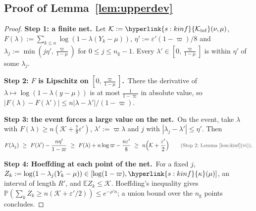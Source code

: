 \documentclass[10pt]{article}
\newcommand{\sy}[2]{{\hyperlink{#1}{#2}}}
\newcommand{\E}{\mathbb{E}}
\newcommand{\PP}{\mathbb{P}}
\newcommand{\1}{\mathbf{1}}
\newcommand{\Ki}{\sy{s:kinf}{\mathcal K_{\inf}}}
\newcommand{\kap}{\sy{s:kinf}{\kappa}}
\newcommand{\stp}[2]{\par\medskip\noindent\textbf{Step #1: #2.}\ }
\newcommand{\why}[1]{\text{\small\color{black!70}(#1)}}
\begin{document}
\subsection{Proof of Lemma~\ref{lem:upperdev}}\label{sec:pf-lem:upperdev}
\begin{proof}
\stp1{a finite net}Let $\mathcal K:=\Ki(\nu,\mu)$, $F(\lambda):=\sum_{k\le n}\log(1-\lambda(Y_k-\mu))$, $\eta':=\varepsilon'(1-\varpi)/8$ and
$\lambda_j:=\min(j\eta',\frac\varpi{1-\mu})$ for $0\le j\le n_{\mathrm g}-1$. Every $\lambda'\in[0,\frac\varpi{1-\mu}]$ is within $\eta'$ of some $\lambda_j$.

\stp2{$F$ is Lipschitz on $[0,\frac\varpi{1-\mu}]$}There the derivative of $\lambda\mapsto\log(1-\lambda(y-\mu))$ is at most $\frac1{1-\varpi}$ in absolute value, so
$|F(\lambda)-F(\lambda')|\le n|\lambda-\lambda'|/(1-\varpi)$.

\stp3{the event forces a large value on the net}On the event, take $\lambda$ with $F(\lambda)\ge n(\mathcal K+\frac78\varepsilon')$, $\lambda':=\varpi\lambda$ and $j$ with
$|\lambda_j-\lambda'|\le\eta'$. Then
\[
F(\lambda_j)\ \ge\ F(\lambda')-\frac{n\eta'}{1-\varpi}\ \ge\ F(\lambda)+n\log\varpi-\frac{n\varepsilon'}8\ \ge\ n\Big(\mathcal K+\frac{\varepsilon'}2\Big)\qquad\why{Step~2; Lemma~\ref{lem:kinf}(vi)}.
\]
\stp4{Hoeffding at each point of the net}For a fixed $j$, $Z_k:=\log(1-\lambda_j(Y_k-\mu))\in[\log(1-\varpi),\kap(\mu)]$, an interval of length $R'$, and $\E Z_k\le\mathcal K$. Hoeffding's
inequality gives $\PP(\sum_kZ_k\ge n(\mathcal K+\varepsilon'/2))\le e^{-\rho'n}$; a union bound over the $n_{\mathrm g}$ points concludes.
\end{proof}
\end{document}
